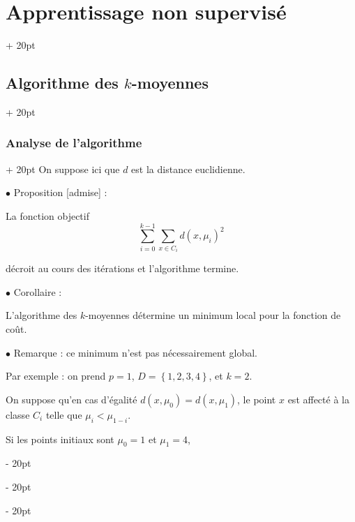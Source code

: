 \documentclass[a4paper, 12pt, twoside]{article}
\newcommand{\set}[1]{\left\{ #1 \right\}}
\newcommand{\ind}[1][20pt]{\advance\leftskip + #1}
\newcommand{\deind}[1][20pt]{\advance\leftskip - #1}
\newenvironment{indt}[2][20pt]{#2 \par \ind[#1]}{\par \deind} %
\begin{document}
\begin{indt}{\section{Apprentissage non supervisé}}
\begin{indt}{\subsection{Algorithme des $k$-moyennes}}
            \begin{indt}{\subsubsection{Analyse de l'algorithme}}
                On suppose ici que $d$ est la distance euclidienne.

                \vspace{12pt}
                
                $\bullet$ Proposition [admise] :
                \begin{emphBox}
                    La fonction objectif
                    \[
                        \sum_{i = 0}^{k - 1} \sum_{x \in C_i} d(x, \mu_i)^2
                    \]

                    décroit au cours des itérations et l'algorithme termine.
                \end{emphBox}

                \vspace{12pt}
                
                $\bullet$ Corollaire :
                \begin{emphBox}
                    L'algorithme des $k$-moyennes détermine un minimum local pour la fonction de coût.
                \end{emphBox}

                \vspace{12pt}
                
                $\bullet$ Remarque : ce minimum n'est pas nécessairement global.
                
                Par exemple : on prend $p = 1$, $D = \set{1, 2, 3, 4}$, et $k = 2$.

                On suppose qu'en cas d'égalité $d(x, \mu_0) = d(x, \mu_1)$, le point $x$ est affecté à la classe $C_i$ telle que $\mu_i < \mu_{1 - i}$.

                Si les points initiaux sont $\mu_0 = 1$ et $\mu_1 = 4$,

                \begin{center}
                \end{center}


\end{indt}
\end{indt}
\end{indt}
\end{document}
